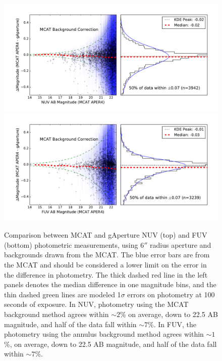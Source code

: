 \documentclass[iop]{emulateapj}
\begin{document}
\begin{figure}[t!]
\includegraphics[scale=0.3]{Fig05a.pdf}\\
\includegraphics[scale=0.3]{Fig05b.pdf}
\caption{Comparison between MCAT and gAperture NUV (top) and FUV (bottom) photometric measurements, using $6''$ radius aperture and backgrounds drawn from the MCAT. The blue error bars are from the MCAT and should be considered a lower limit on the error in the difference in photometry. The thick dashed red line in the left panels denotes the median difference in one magnitude bins, and the thin dashed green lines are modeled 1$\sigma$ errors on photometry at 100 seconds of exposure. In NUV, photometry using the MCAT background method agrees within $\sim 2$\% on average, down to 22.5 AB magnitude, and half of the data fall within $\sim 7$\%. In FUV, the photometry using the annulus background method agrees within $\sim 1$\%, on average, down to 22.5 AB magnitude, and half of the data fall within $\sim 7$\%.
\label{mcatrelphot}}
\end{figure}
\end{document}
